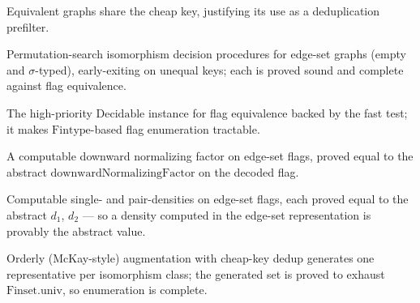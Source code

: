 \begin{theorem}
  \label{thm:deg-key-iso-invariant}
  \leanok
  Equivalent graphs share the cheap key, justifying its use as a deduplication
  prefilter.
\end{theorem}

\begin{definition}
  \label{def:fast-iso}
  \leanok
  Permutation-search isomorphism decision procedures for edge-set graphs (empty
  and $\sigma$-typed), early-exiting on unequal keys; each is proved sound and
  complete against flag equivalence.
\end{definition}

\begin{definition}
  \label{def:fast-iso-decidable}
  \leanok
  The high-priority $\mathrm{Decidable}$ instance for flag equivalence backed by
  the fast test; it makes $\mathrm{Fintype}$-based flag enumeration tractable.
\end{definition}

\begin{theorem}
  \label{thm:downward-compute}
  \leanok
  A computable downward normalizing factor on edge-set flags, proved equal to the
  abstract $\mathrm{downwardNormalizingFactor}$ on the decoded flag.
\end{theorem}

\begin{theorem}
  \label{thm:density-compute}
  \leanok
  Computable single- and pair-densities on edge-set flags, each proved equal to
  the abstract $d_1$, $d_2$ --- so a density computed in the edge-set
  representation is provably the abstract value.
\end{theorem}

\begin{theorem}
  \label{thm:flag-enumeration}
  \leanok
  Orderly (McKay-style) augmentation with cheap-key dedup generates one
  representative per isomorphism class; the generated set is proved to exhaust
  $\mathrm{Finset.univ}$, so enumeration is complete.
\end{theorem}

